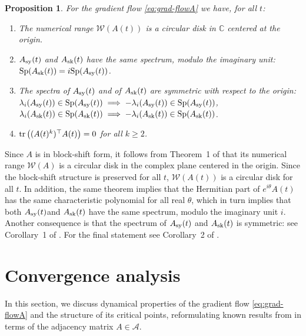 \documentclass{article}
\makeatletter
\renewenvironment{proof}[1][\proofname]{
  \par\pushQED{\qed}\normalfont
  \topsep6\p@\@plus6\p@\relax
  \trivlist\item[\hskip\labelsep\bfseries#1\@addpunct{.}]
  \ignorespaces
}{
  \popQED\endtrivlist\@endpefalse
}
\newtheorem{proposition}{Proposition}
\def\tr{{\rm tr}}
\newcommand{\1}{\mathds{1}}
\makeatother
\begin{document}
\begin{proposition}
For the gradient flow \eqref{eq:grad-flowA} we have, for all $t$:
\begin{enumerate}
    \item The numerical range $ \mathcal{W}(A(t)) $ is a circular disk in $ \mathbb{C}$ centered at the origin.
    \item $ A_{\rm sy}(t) $ and $ A_{\rm sk}(t)$ have the same spectrum, modulo the imaginary unit: $ {\rm Sp}(A_{\rm sk}(t)) = i  {\rm Sp}(A_{\rm sy}(t)) $.
    \item The spectra of $ A_{\rm sy}(t) $ and of $ A_{\rm sk}(t) $ are symmetric with respect to the origin:\\ $ \lambda_i(A_{\rm sy}(t)) \in {\rm Sp}(A_{\rm sy} (t)) \; \Longrightarrow \; -\lambda_i (A_{\rm sy}(t)) \in {\rm Sp} (A_{\rm sy}(t))$, \\$ \lambda_i(A_{\rm sk}(t)) \in {\rm Sp}(A_{\rm sk}(t) ) \; \Longrightarrow \; -\lambda_i (A_{\rm sk}(t)) \in {\rm Sp} (A_{\rm sk}(t))$.
    \item $ \tr\left( (A(t)^k)^\top A(t) \right) =0 $ for all $  k \geq 2$.
\end{enumerate}
\end{proposition}
\begin{proof}
 Since $ A$ is in block-shift form, it follows from Theorem~1 of \cite{tam1994circularity} that its numerical range $ \mathcal{W}(A) $ is a circular disk in the complex plane centered in the origin. Since the block-shift structure is preserved for all $t$, $ \mathcal{W}(A(t)) $ is a circular disk for all $t$. In addition, the same theorem implies that the Hermitian part of $ e^{i \theta} A(t) $ has the same characteristic polynomial for all real $ \theta $, which in turn implies that both $A_{\rm sy} (t) $and  $ A_{\rm sk}(t) $ have the same spectrum, modulo the imaginary unit $i$.
Another consequence is that the spectrum of $A_{\rm sy}(t) $ and $ A_{\rm sk}(t)$ is symmetric:  see Corollary~1 of \cite{tam1994circularity}.
For the final statement see Corollary~2 of \cite{tam1994circularity}.
   
\end{proof}



\section{Convergence analysis}
\label{sec:conv-analysis}
In this section, we discuss dynamical properties of the gradient flow \eqref{eq:grad-flowA} and the structure of its critical points, reformulating known results from \cite{achour2021loss,kawaguchi2016deep,chitour2018geometric,yun2017global} in terms of the adjacency matrix $A \in \mathcal{A}$.
\end{document}
